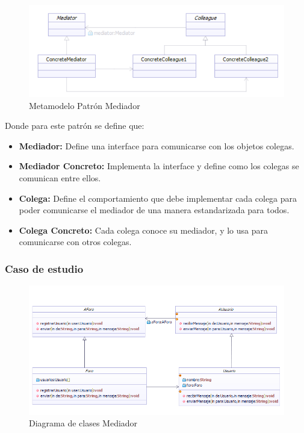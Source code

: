 \begin{figure}[th!]
	\centering
	\includegraphics[width=0.8\linewidth]{arquitectura/imagenes/modeloMediador}
	\caption{Metamodelo Patrón Mediador}
	\label{fig:metamodelo patron mediador}
\end{figure}

Donde para este patrón se define que:
\begin{itemize}
	\item \textbf{Mediador: }Define una interface para comunicarse con los objetos colegas.
	\item \textbf{Mediador Concreto: }Implementa la interface y define como los colegas se comunican entre ellos.
	\item \textbf{Colega: }Define el comportamiento que debe implementar cada colega para poder comunicarse el mediador de una manera estandarizada para todos.
	\item \textbf{Colega Concreto: }Cada colega conoce su mediador, y lo usa para comunicarse con otros colegas.
\end{itemize}

\subsubsection{Caso de estudio}

\begin{figure}[th!]
	\centering
	\includegraphics[width=1\linewidth]{arquitectura/imagenes/DiagramaMediator}
	\caption{Diagrama de clases Mediador}
\end{figure}


